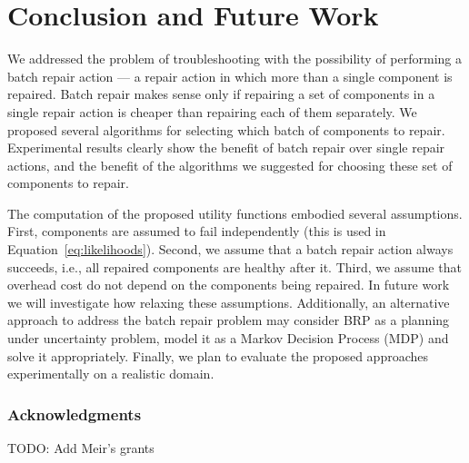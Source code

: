 \documentclass[review]{elsarticle}
\newcommand{\myopic}{{\tt Myopic-BRP}}
\newcommand{\planbased}{{\tt Plan-based-BRP}}
\begin{document}


\section{Conclusion and Future Work}
We addressed the problem of troubleshooting with the possibility of performing a batch repair action --- a repair action in which more than a single component is repaired. Batch repair makes sense only if repairing a set of components in a single repair action is cheaper than repairing each of them separately. We proposed several algorithms for selecting which batch of components to repair. Experimental results clearly show the benefit of batch repair over single repair actions, and the benefit of the algorithms we suggested for choosing these set of components to repair.

The computation of the proposed utility functions embodied several assumptions. First, components are assumed to fail independently (this is used in Equation~\ref{eq:likelihoods}). Second, we assume that a batch repair action always succeeds, i.e., all repaired components are healthy after it. Third, we assume that overhead cost do not depend on the components being repaired. In future work we will investigate how relaxing these assumptions. %
Additionally, an alternative approach to address the batch repair problem may consider BRP as a planning under uncertainty problem, model it as a Markov Decision Process (MDP) and solve it appropriately. Finally, we plan to evaluate the proposed approaches experimentally on a realistic domain.

\subsubsection*{Acknowledgments}
TODO: Add Meir's grants	



%

\end{document}
